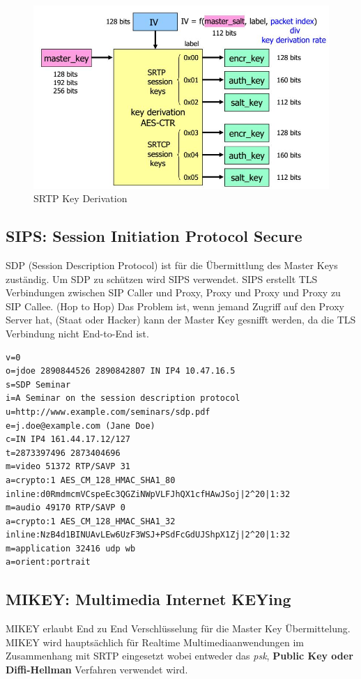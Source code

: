 \begin{figure}[h]
\centering
\includegraphics[width=0.5\linewidth]{images/srtp_key_derivation}
\caption{SRTP Key Derivation}
\label{fig:srtpkeyderivation}
\end{figure}

\subsection{SIPS: Session Initiation Protocol Secure}
SDP (Session Description Protocol) ist für die Übermittlung des Master Keys zuständig. Um SDP zu schützen wird SIPS verwendet. SIPS erstellt TLS Verbindungen zwischen SIP Caller und Proxy, Proxy und Proxy und Proxy zu SIP Callee. (Hop to Hop) Das Problem ist, wenn jemand Zugriff auf den Proxy Server hat, (Staat oder Hacker) kann der Master Key gesnifft werden, da die TLS Verbindung nicht End-to-End ist.

\begin{lstlisting}[caption=Unverschlüsselte SDP Master Key Übertragung (crypto)]
v=0
o=jdoe 2890844526 2890842807 IN IP4 10.47.16.5
s=SDP Seminar
i=A Seminar on the session description protocol
u=http://www.example.com/seminars/sdp.pdf
e=j.doe@example.com (Jane Doe)
c=IN IP4 161.44.17.12/127
t=2873397496 2873404696
m=video 51372 RTP/SAVP 31
a=crypto:1 AES_CM_128_HMAC_SHA1_80
inline:d0RmdmcmVCspeEc3QGZiNWpVLFJhQX1cfHAwJSoj|2^20|1:32
m=audio 49170 RTP/SAVP 0
a=crypto:1 AES_CM_128_HMAC_SHA1_32
inline:NzB4d1BINUAvLEw6UzF3WSJ+PSdFcGdUJShpX1Zj|2^20|1:32
m=application 32416 udp wb
a=orient:portrait
\end{lstlisting}

\subsection{MIKEY: Multimedia Internet KEYing}
MIKEY erlaubt End zu End Verschlüsselung für die Master Key Übermittelung. MIKEY wird hauptsächlich für Realtime Multimediaanwendungen im Zusammenhang mit SRTP eingesetzt wobei entweder das \textit{psk}, \textbf{Public Key oder Diffi-Hellman} Verfahren verwendet wird.


